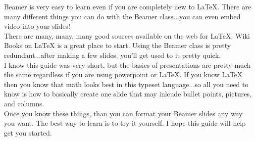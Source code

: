 \documentclass{beamer}  %
\begin{document}
\begin{frame}{}
Beamer is very easy to learn even if you are completely new to {\LaTeX}.  There are many different things you can do
with the Beamer class...you can even embed video into your slides!\\[0.2cm]

There are many, many, many good sources available on the web for {\LaTeX}.  Wiki Books on {\LaTeX} is a great place to start.  Using the Beamer class is pretty redundant...after making a few slides, you'll get used to it pretty 
quick.\\[0.2cm]

I know this guide was very short, but the basics of presentations are pretty much the same regardless if you are using powerpoint or {\LaTeX}.  If you know {\LaTeX} then you know that math looks best in this typeset language...so all you need to know is how to basically create one slide that may inlcude bullet points, pictures, and columns. \\[0.2cm]

Once you know these things, than you can format your Beamer slides any way you want.  The best way to learn is to try
it yourself.  I hope this guide will help get you started.

\end{frame}
\end{document}
